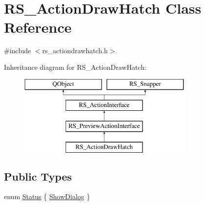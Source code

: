 \hypertarget{classRS__ActionDrawHatch}{\section{R\-S\-\_\-\-Action\-Draw\-Hatch Class Reference}
\label{classRS__ActionDrawHatch}
}


{\ttfamily \#include $<$rs\-\_\-actiondrawhatch.\-h$>$}

Inheritance diagram for R\-S\-\_\-\-Action\-Draw\-Hatch\-:\begin{figure}[H]
\begin{center}
\leavevmode
\includegraphics[height=4.000000cm]{classRS__ActionDrawHatch}
\end{center}
\end{figure}
\subsection*{Public Types}
\begin{DoxyCompactItemize}
\item 
enum \hyperlink{classRS__ActionDrawHatch_a92f87652a726cb5b495530954c83881c}{Status} \{ \hyperlink{classRS__ActionDrawHatch_a92f87652a726cb5b495530954c83881ca279a3bad2dbbb5469f5f66621f1c3f5e}{Show\-Dialog}
 \}
\end{DoxyCompactItemize}
